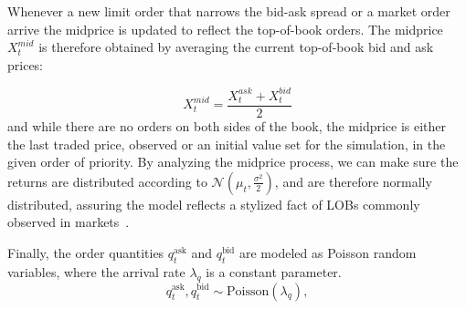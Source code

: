 Whenever a new limit order that narrows the bid-ask spread or a market order arrive the midprice is updated to reflect the top-of-book orders.
The midprice $X_{t}^{mid}$ is therefore obtained by averaging the current top-of-book bid and ask prices:

\[
    X_{t}^{mid} = \frac{X_{t}^{ask} + X_{t}^{bid}}{2}
\]
and while there are no orders on both sides of the book, the midprice is either the last traded price,
observed or an initial value set for the simulation, in the given order of priority.
By analyzing the midprice process, we can make sure the returns are distributed according to $\mathcal{N}\left(\mu_t, \frac{\sigma^2}{2}\right)$,
and are therefore normally distributed, assuring the model reflects a stylized fact of LOBs commonly observed in markets~\cite{Gueant2022}.

Finally, the order quantities $q_t^{\text{ask}}$ and $q_t^{\text{bid}}$ are modeled as Poisson random variables, where the arrival rate $\lambda_q$ is a constant parameter.
\[
    q_t^{\text{ask}}, q_t^{\text{bid}} \sim \text{Poisson}(\lambda_q),
\]
